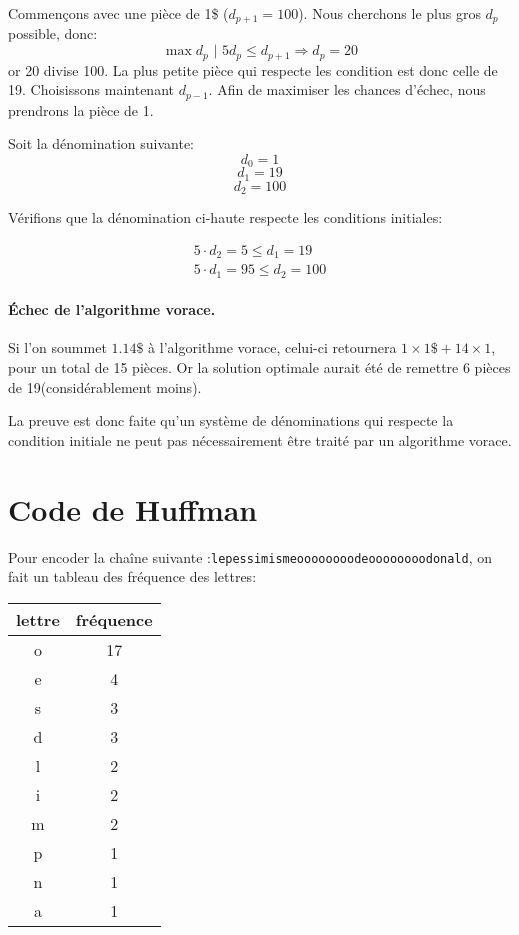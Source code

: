 \documentclass{article}
\begin{document}
Commençons avec une pièce de 1\$ ($d_{p+1}=100$). Nous cherchons le plus gros $d_p$ possible, donc:
$$\max d_p\text{ | }5d_p \leq d_{p+1} \Rightarrow d_p = 20$$
or 20 divise 100. La plus petite pièce qui respecte les condition est donc celle de 19\textcent. Choisissons maintenant $d_{p-1}$. Afin de maximiser les chances d'échec, nous prendrons la pièce de 1\textcent.

Soit la dénomination suivante:
$$d_0 = 1$$
$$d_1 = 19$$
$$d_2 = 100$$

Vérifions que la dénomination ci-haute respecte les conditions initiales:

\begin{align*}
  5 \cdot d_2 = 5 \leq d_1 = 19\\
  5 \cdot d_1 = 95 \leq d_2 = 100
\end{align*}

\paragraph{Échec de l'algorithme vorace.}

Si l'on soummet $1.14\$$ à l'algorithme vorace, celui-ci retournera $1 \times 1\$ + 14 \times 1$\textcent, pour un total de 15 pièces. Or la solution optimale aurait été de remettre 6 pièces de 19\textcent (considérablement moins).

La preuve est donc faite qu'un système de dénominations qui respecte la condition initiale ne peut pas nécessairement être traité par un algorithme vorace.

\pagebreak

\section{Code de Huffman}
Pour encoder la chaîne suivante :\texttt{lepessimismeoooooooodeoooooooodonald}, on fait un tableau des fréquence des lettres:

\begin{center}
  \begin{tabular}{c|c}
    lettre & fréquence \\
    \hline \hline
    o & 17 \\
    e & 4 \\
    s & 3 \\
    d & 3 \\
    l & 2 \\
    i & 2 \\
    m & 2 \\
    p & 1 \\
    n & 1 \\
    a & 1
  \end{tabular}
\end{center}
\end{document}
